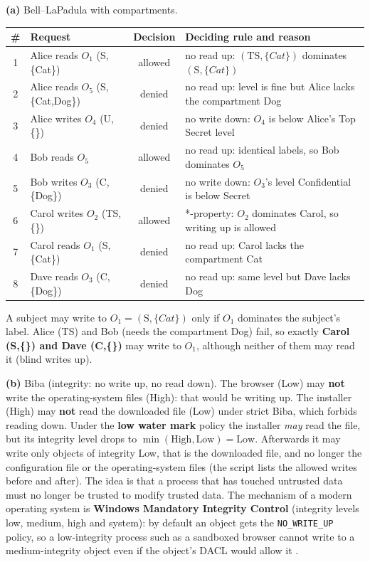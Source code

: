 \documentclass[11pt,a4paper]{article}
\begin{document}
\begin{table}[H]
\textbf{(a)} Bell--LaPadula with compartments.\par\smallskip
\centering\small
\begin{tabularx}{\textwidth}{@{}clcL@{}}
\toprule
\# & Request & Decision & Deciding rule and reason \\
 & Alice reads $O_1$ (S,\{Cat\}) & allowed & no read up: $(\mathrm{TS},\{Cat\})$ dominates $(\mathrm{S},\{Cat\})$ \\
2 & Alice reads $O_5$ (S,\{Cat,Dog\}) & denied & no read up: level is fine but Alice lacks the compartment Dog \\
3 & Alice writes $O_4$ (U,\{\}) & denied & no write down: $O_4$ is below Alice's Top Secret level \\
4 & Bob reads $O_5$ & allowed & no read up: identical labels, so Bob dominates $O_5$ \\
5 & Bob writes $O_3$ (C,\{Dog\}) & denied & no write down: $O_3$'s level Confidential is below Secret \\
6 & Carol writes $O_2$ (TS,\{\}) & allowed & *-property: $O_2$ dominates Carol, so writing up is allowed \\
7 & Carol reads $O_1$ (S,\{Cat\}) & denied & no read up: Carol lacks the compartment Cat \\
8 & Dave reads $O_3$ (C,\{Dog\}) & denied & no read up: same level but Dave lacks Dog \\
\bottomrule
\end{tabularx}
\end{table}
A subject may write to $O_1=(\mathrm{S},\{Cat\})$ only if $O_1$ dominates the subject's label. Alice (TS) and
Bob (needs the compartment Dog) fail, so exactly \textbf{Carol (S,\{\}) and Dave (C,\{\})} may write to
$O_1$, although neither of them may read it (blind writes up).

\textbf{(b)} Biba (integrity: no write up, no read down).
The browser (Low) may \textbf{not} write the operating-system files (High): that would be writing up.
The installer (High) may \textbf{not} read the downloaded file (Low) under strict Biba, which forbids reading down.
Under the \textbf{low water mark} policy the installer \emph{may} read the file, but its integrity level
drops to $\min(\text{High},\text{Low})=\text{Low}$. Afterwards it may write only objects of integrity Low,
that is the downloaded file, and no longer the configuration file or the operating-system files (the script
lists the allowed writes before and after). The idea is that a process that has touched untrusted data must no
longer be trusted to modify trusted data. The mechanism of a modern operating system is \textbf{Windows Mandatory
Integrity Control} (integrity levels low, medium, high and system): by default an object gets the
\texttt{NO\_WRITE\_UP} policy, so a low-integrity process such as a sandboxed browser cannot write to a medium-integrity
object even if the object's DACL would allow it \cite{mic}.
\end{document}
